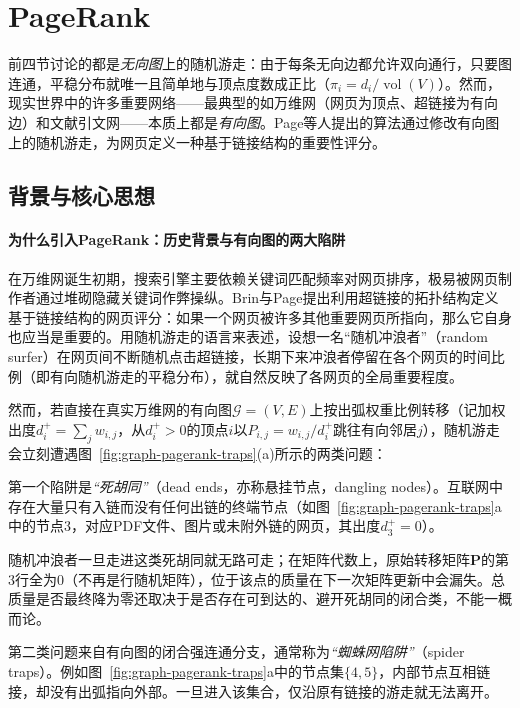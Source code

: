 \section{PageRank}
\label{sec:graph-pagerank}

前四节讨论的都是\emph{无向图}上的随机游走：由于每条无向边都允许双向通行，只要图连通，平稳分布就唯一且简单地与顶点度数成正比（$\pi_i=d_i/\operatorname{vol}(V)$）。然而，现实世界中的许多重要网络——最典型的如万维网（网页为顶点、超链接为有向边）和文献引文网——本质上都是\emph{有向图}。Page等人提出的算法通过修改有向图上的随机游走，为网页定义一种基于链接结构的重要性评分。

\subsection{背景与核心思想}
\label{sec:graph-pagerank-equation}

\paragraph{为什么引入PageRank：历史背景与有向图的两大陷阱}

在万维网诞生初期，搜索引擎主要依赖关键词匹配频率对网页排序，极易被网页制作者通过堆砌隐藏关键词作弊操纵。Brin与Page提出利用超链接的拓扑结构定义基于链接结构的网页评分：如果一个网页被许多其他重要网页所指向，那么它自身也应当是重要的。用随机游走的语言来表述，设想一名“随机冲浪者”（random surfer）在网页间不断随机点击超链接，长期下来冲浪者停留在各个网页的时间比例（即有向随机游走的平稳分布），就自然反映了各网页的全局重要程度。

然而，若直接在真实万维网的有向图$\mathcal G=(V,E)$上按出弧权重比例转移（记加权出度$d_i^+=\sum_j w_{i,j}$，从$d_i^+>0$的顶点$i$以$P_{i,j}=w_{i,j}/d_i^+$跳往有向邻居$j$），随机游走会立刻遭遇图~\ref{fig:graph-pagerank-traps}(a)所示的两类问题：

第一个陷阱是\emph{“死胡同”}（dead ends，亦称悬挂节点，dangling nodes）。互联网中存在大量只有入链而没有任何出链的终端节点（如图~\ref{fig:graph-pagerank-traps}a中的节点$3$，对应PDF文件、图片或未附外链的网页，其出度$d_3^+=0$）。

随机冲浪者一旦走进这类死胡同就无路可走；在矩阵代数上，原始转移矩阵$\bm P$的第$3$行全为$0$（不再是行随机矩阵），位于该点的质量在下一次矩阵更新中会漏失。总质量是否最终降为零还取决于是否存在可到达的、避开死胡同的闭合类，不能一概而论。

第二类问题来自有向图的闭合强连通分支，通常称为\emph{“蜘蛛网陷阱”}（spider traps）。例如图~\ref{fig:graph-pagerank-traps}a中的节点集$\{4,5\}$，内部节点互相链接，却没有出弧指向外部。一旦进入该集合，仅沿原有链接的游走就无法离开。

